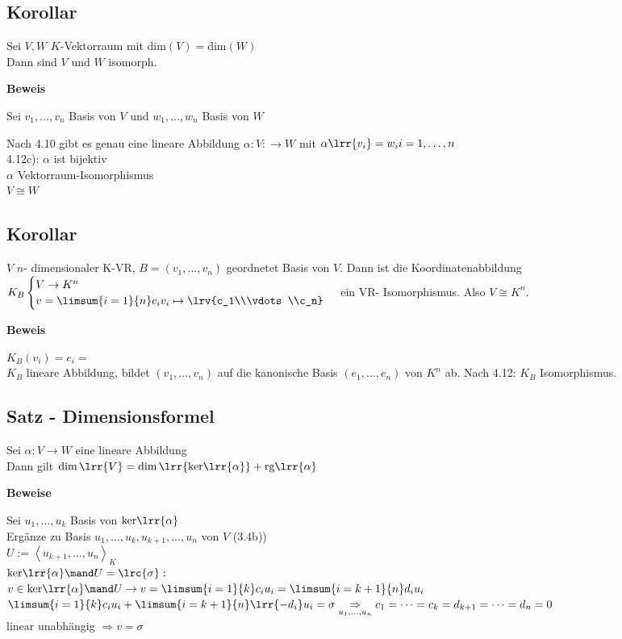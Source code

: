\subsection{Korollar}
	Sei $V,W$ $K$-Vektorraum mit dim$(V)=$dim$(W)$\\
	Dann sind $V$ und $W$ isomorph.
	
	\textbf{Beweis}
	
	Sei $v_1,\dots,v_n$ Basis von $V$ und $w_1,\dots,w_n$ Basis von $W$
	
	Nach 4.10 gibt es genau eine lineare Abbildung $\alpha:V:\rightarrow W$ mit $\alpha\lrr{v_i}=w_i i=1,\dots,n$\\
	4.12c): $\alpha$ ist bijektiv\\
	$\alpha$ Vektorraum-Isomorphismus\\
	$V\cong W$

\subsection{Korollar}
  $V$ $n$- dimensionaler K-VR, $B=(v_1,...,v_n)$ geordnetet Basis von $V$. Dann
ist die Koordinatenabbildung $K_B\begin{cases}V\rightarrow
K^n\\v=\limsum{i=1}{n}c_iv_i\mapsto\lrv{c_1\\\vdots\\c_n}\end{cases}$ ein VR-
Isomorphismus. Also $V\cong K^n$.

  \textbf{Beweis}
  
  $K_B(v_i)=e_i=$\\
  $K_B$ lineare Abbildung, bildet $(v_1,...,v_n)$ auf die kanonische Basis
  $(e_1,...,e_n)$ von $K^n$ ab. Nach 4.12: $K_B$ Isomorphismus.

\subsection{Satz - Dimensionsformel}
	Sei $\alpha:V\rightarrow W$ eine lineare Abbildung\\
	Dann gilt $\dim\lrr{V}=\dim\lrr{\mbox{ker}\lrr{\alpha}}+\mbox{rg}\lrr{\alpha}$
	
	\textbf{Beweise}
	
	Sei $u_1,\dots,u_k$ Basis von $\mbox{ker}\lrr{\alpha}$\\
	Ergänze zu Basis $u_1,\dots,u_k,u_{k+1},\dots,u_n$ von $V$ (3.4b))\\
	$U:=\left\langle u_{k+1},\dots,u_n\right\rangle_K$\\
	$\mbox{ker}\lrr{\alpha}\mand U=\lrc{\sigma}:$\\
	$v\in\mbox{ker}\lrr{\alpha}\mand U\rightarrow v=\limsum{i=1}{k}c_iu_i=\limsum{i=k+1}{n}d_iu_i$\\
	$\limsum{i=1}{k}c_iu_i+\limsum{i=k+1}{n}\lrr{-d_i}u_i=\sigma\underset{\scriptstyle u_1,\dots,u_n}{\Rightarrow} c_1=\dots=c_k=d_{k+1}=\dots=d_n=0$\\
	linear unabhängig $\Rightarrow v=\sigma$
	
